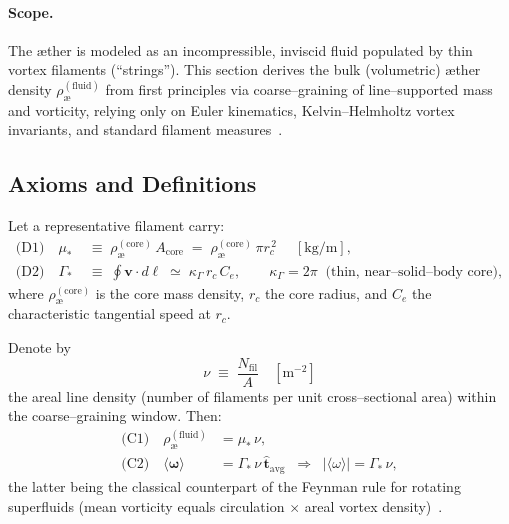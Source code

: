\documentclass[11pt, a4paper]{article}
\begin{document}
\paragraph{Scope.}
The æther is modeled as an incompressible, inviscid fluid populated by thin vortex filaments (“strings”). This section derives the bulk (volumetric) æther density \(\rho_{\text{\ae}}^{(\text{fluid})}\) from first principles via coarse–graining of line–supported mass and vorticity, relying only on Euler kinematics, Kelvin–Helmholtz vortex invariants, and standard filament measures~\cite{Helmholtz1858,Kelvin1869,Saffman1992}.

\subsection{Axioms and Definitions}
Let a representative filament carry:
\begin{align}
    \text{(D1)}\quad
    \mu_\ast &\;\equiv\; \rho_{\text{\ae}}^{(\text{core})}\,A_{\text{core}}
    \;=\; \rho_{\text{\ae}}^{(\text{core})}\,\pi r_c^{\,2}
    \quad\;[\mathrm{kg/m}], \label{eq:D1} \\[2mm]
    \text{(D2)}\quad
    \Gamma_\ast &\;\equiv\; \oint \mathbf{v}\!\cdot\! d\boldsymbol{\ell}
    \;\simeq\; \kappa_\Gamma\, r_c\, C_e,
    \qquad \kappa_\Gamma=2\pi \;\; \text{(thin, near–solid–body core)}, \label{eq:D2}
\end{align}
where \(\rho_{\text{\ae}}^{(\text{core})}\) is the core mass density, \(r_c\) the core radius, and \(C_e\) the characteristic tangential speed at \(r_c\).

Denote by
\[
    \nu \;\equiv\; \frac{N_{\text{fil}}}{A} \quad [\mathrm{m^{-2}}]
\]
the areal line density (number of filaments per unit cross–sectional area) within the coarse–graining window. Then:
\begin{align}
    \text{(C1)}\quad
    \rho_{\text{\ae}}^{(\text{fluid})} &= \mu_\ast\,\nu,
    \label{eq:C1} \\[2mm]
    \text{(C2)}\quad
    \langle \boldsymbol{\omega}\rangle &= \Gamma_\ast\,\nu\,\hat{\mathbf{t}}_{\text{avg}}
    \;\;\Rightarrow\;\; |\langle\omega\rangle|=\Gamma_\ast\,\nu,
    \label{eq:C2}
\end{align}
the latter being the classical counterpart of the Feynman rule for rotating superfluids (mean vorticity equals circulation \(\times\) areal vortex density)~\cite{Feynman1955,Donnelly1991,Saffman1992}.
\end{document}
